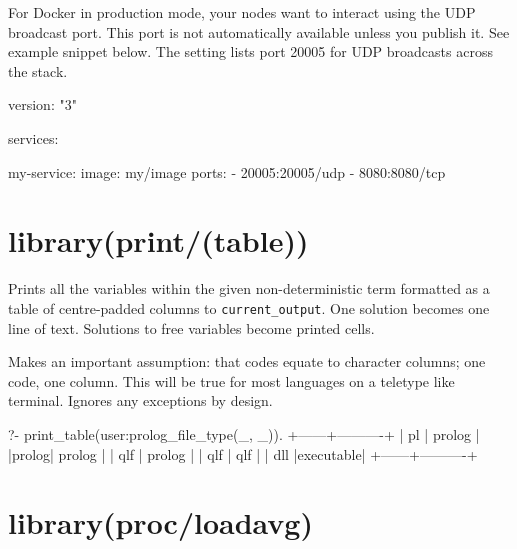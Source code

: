 For Docker in production mode, your nodes want to interact using the UDP
broadcast port. This port is not automatically available unless you
publish it. See example snippet below. The  setting lists port
20005 for UDP broadcasts across the stack.

\begin{code}
version: "3"

services:

  my-service:
    image: my/image
    ports:
      - 20005:20005/udp
      - 8080:8080/tcp
\end{code}

\vspace{0.7cm}\chapter{library(print/(table))}\label{sec:table}

\begin{description}
\nodescription
Prints all the variables within the given non-deterministic 
term formatted as a table of centre-padded columns to
\verb$current_output$. One  solution becomes one line of text.
Solutions to free variables become printed cells.

Makes an important assumption: that codes equate to character
columns; one code, one column. This will be true for most languages
on a teletype like terminal. Ignores any exceptions by design.

\begin{code}
?- print_table(user:prolog_file_type(_, _)).
+------+----------+
|  pl  |  prolog  |
|prolog|  prolog  |
| qlf  |  prolog  |
| qlf  |   qlf    |
| dll  |executable|
+------+----------+
\end{code}

\end{description}

\chapter{library(proc/loadavg)}\label{sec:loadavg}

